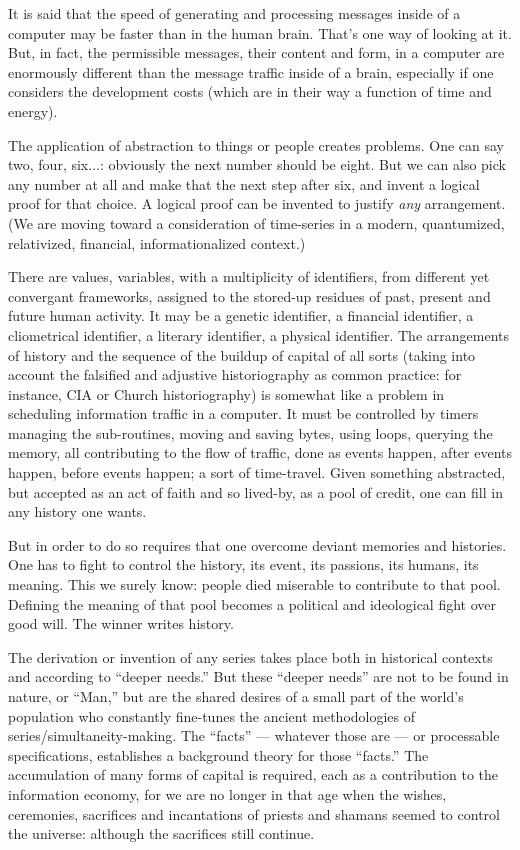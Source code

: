It is said that the speed of generating and processing messages inside of a computer may be faster than in the human brain. That's one way of looking at it. But, in fact, the permissible messages, their content and form, in a computer are enormously different than the message traffic inside of a brain, especially if one considers the development costs (which are in their way a function of time and energy).

The application of abstraction to things or people creates problems. One can say two, four, six...: obviously the next number should be eight. But we can also pick any number at all and make that the next step after six, and invent a logical proof for that choice. A logical proof can be invented to justify \emph{any} arrangement. (We are moving toward a consideration of time-series in a modern, quantumized, relativized, financial, informationalized context.)

There are values, variables, with a multiplicity of identifiers, from different yet convergant frameworks, assigned to the stored-up residues of past, present and future human activity. It may be a genetic identifier, a financial identifier, a cliometrical identifier, a literary identifier, a physical identifier. The arrangements of history and the sequence of the buildup of capital of all sorts (taking into account the falsified and adjustive historiography as common practice: for instance, CIA or Church historiography) is somewhat like a problem in scheduling information traffic in a computer. It must be controlled by timers managing the sub-routines, moving and saving bytes, using loops, querying the memory, all contributing to the flow of traffic, done as events happen, after events happen, before events happen; a sort of time-travel. Given something abstracted, but accepted as an act of faith and so lived-by, as a pool of credit, one can fill in any history one wants.

But in order to do so requires that one overcome deviant memories and histories. One has to fight to control the history, its event, its passions, its humans, its meaning. This we surely know: people died miserable to contribute to that pool. Defining the meaning of that pool becomes a political and ideological fight over good will. The winner writes history.

The derivation or invention of any series takes place both in historical contexts and according to \enquote{deeper needs.} But these \enquote{deeper needs} are not to be found in nature, or \enquote{Man,} but are the shared desires of a small part of the world's population who constantly fine-tunes the ancient methodologies of series\slash simultaneity-making. The \enquote{facts} --- whatever those are --- or processable specifications, establishes a background theory for those \enquote{facts.} The accumulation of many forms of capital is required, each as a contribution to the information economy, for we are no longer in that age when the wishes, ceremonies, sacrifices and incantations of priests and shamans seemed to control the universe: although the sacrifices still continue.

